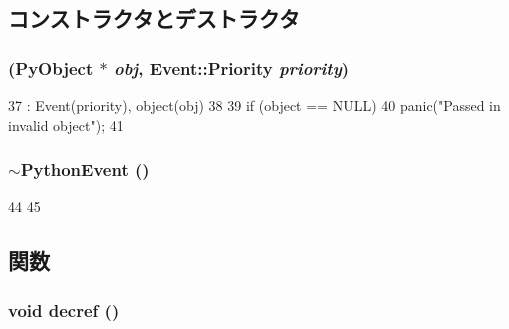 \subsection{コンストラクタとデストラクタ}
\hypertarget{classPythonEvent_a7b5b591484681e521fc822e2e17492ff}{
\subsubsection[{PythonEvent}]{ ({\bf PyObject} $\ast$ {\em obj}, \/  {\bf Event::Priority} {\em priority})}}
\label{classPythonEvent_a7b5b591484681e521fc822e2e17492ff}



\begin{DoxyCode}
37     : Event(priority), object(obj)
38 {
39     if (object == NULL)
40         panic("Passed in invalid object");
41 }
\end{DoxyCode}
\hypertarget{classPythonEvent_a3c32227a61801ec263cc1bb68f5a0546}{
\subsubsection[{$\sim$PythonEvent}]{\setlength{\rightskip}{0pt plus 5cm}$\sim${\bf PythonEvent} ()}}
\label{classPythonEvent_a3c32227a61801ec263cc1bb68f5a0546}



\begin{DoxyCode}
44 {
45 }
\end{DoxyCode}


\subsection{関数}
\hypertarget{classPythonEvent_a0ff5c4fba5e67643030a3e2f5b70a737}{
\subsubsection[{decref}]{\setlength{\rightskip}{0pt plus 5cm}void decref ()}}
\label{classPythonEvent_a0ff5c4fba5e67643030a3e2f5b70a737}



